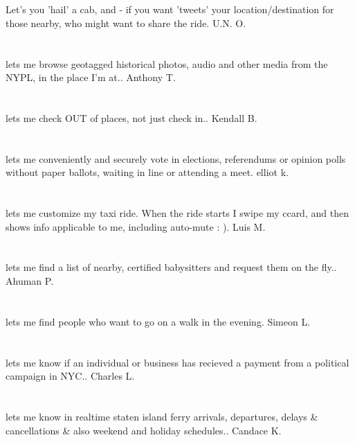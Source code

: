 \section{}Let's you 'hail' a cab,  and - if you want 'tweets' your location/destination for those nearby,  who might want to share the ride. U.N. O.
\section{}lets me browse geotagged historical photos,  audio and other media from the NYPL,  in the place I'm at.. Anthony T.
\section{}lets me check OUT of places,  not just check in.. Kendall B.
\section{}lets me conveniently and securely vote in elections,  referendums or opinion polls without paper ballots,  waiting in line or attending a meet. elliot k.
\section{}lets me customize my taxi ride. When the ride starts I swipe my ccard,  and then shows info applicable to me,  including auto-mute : ). Luis M.
\section{}lets me find a list of nearby,  certified babysitters and request them on the fly.. Ahuman P.
\section{}lets me find people who want to go on a walk in the evening. Simeon L.
\section{}lets me know if an individual or business has recieved a payment from a political campaign in NYC.. Charles L.
\section{}lets me know in realtime staten island ferry arrivals,  departures,  delays \& cancellations \& also weekend and holiday schedules.. Candace K.
